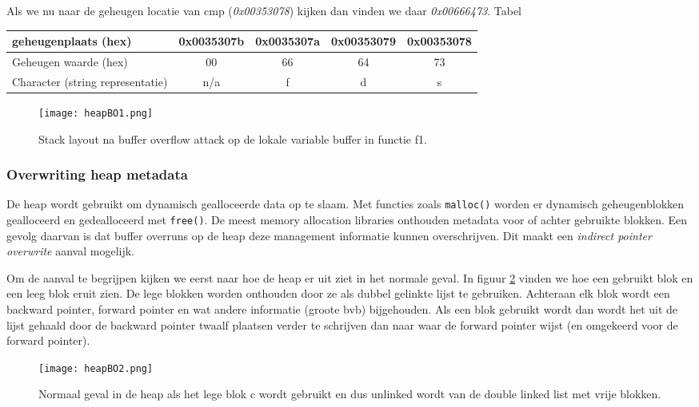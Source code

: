 \documentclass[../main.tex]{subfiles}
\begin{document}
Als we nu naar de geheugen locatie van cmp (\emph{0x00353078}) kijken dan vinden we daar \emph{0x00666473}.
Tabel
\begin{table}
\centering
\begin{tabular}{l|cccc|}
		geheugenplaats (hex) & 0x0035307b & 0x0035307a & 0x00353079 & 0x00353078 \\ \hline
		Geheugen waarde (hex) & 00 & 66 & 64 & 73 \\ \hline
		Character (string representatie) & n/a & f & d & s \\ \hline
\end{tabular}
\end{table}

\begin{figure}
\centering
\texttt{[image: heapBO1.png]}
\caption{Stack layout na buffer overflow attack op de lokale variable buffer in functie f1.}
\label{f:heapBO1}
\end{figure}

\subsubsection{Overwriting heap metadata}
De heap wordt gebruikt om dynamisch gealloceerde data op te slaam.
Met functies zoals \lstinline[style=ilcstyle]{malloc()} worden er dynamisch geheugenblokken gealloceerd en gedealloceerd met \lstinline[style=ilcstyle]{free()}.
De meest memory allocation libraries onthouden metadata voor of achter gebruikte blokken.
Een gevolg daarvan is dat buffer overruns op de heap deze management informatie kunnen overschrijven.
Dit maakt een \emph{indirect pointer overwrite} aanval mogelijk.

Om de aanval te begrijpen kijken we eerst naar hoe de heap er uit ziet in het normale geval.
In figuur \ref{f:heapBO2} vinden we hoe een gebruikt blok en een leeg blok eruit zien.
De lege blokken worden onthouden door ze als dubbel gelinkte lijst te gebruiken.
Achteraan elk blok wordt een backward pointer, forward pointer en wat andere informatie (groote bvb) bijgehouden.
Als een blok gebruikt wordt dan wordt het uit de lijst gehaald door de backward pointer twaalf plaatsen verder te schrijven dan naar waar de forward pointer wijst (en omgekeerd voor de forward pointer).

\begin{figure}
\centering
\texttt{[image: heapBO2.png]}
\caption{Normaal geval in de heap als het lege blok c wordt gebruikt en dus unlinked wordt van de double linked list met vrije blokken.}
\label{f:heapBO2}
\end{figure}
\end{document}
